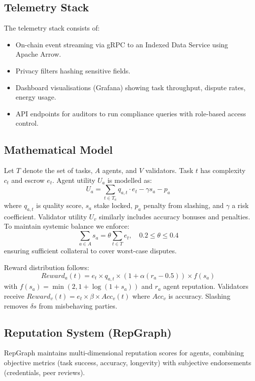 \documentclass[11pt]{article}
\begin{document}
\subsection{Telemetry Stack}
The telemetry stack consists of:
\begin{itemize}[noitemsep]
  \item On-chain event streaming via gRPC to an Indexed Data Service using Apache Arrow.
  \item Privacy filters hashing sensitive fields.
  \item Dashboard visualisations (Grafana) showing task throughput, dispute rates, energy usage.
  \item API endpoints for auditors to run compliance queries with role-based access control.
\end{itemize}

\subsection{Mathematical Model}
Let $T$ denote the set of tasks, $A$ agents, and $V$ validators. Task $t$ has complexity $c_t$ and escrow $e_t$. Agent utility $U_a$ is modelled as:
\begin{equation}
U_a = \sum_{t \in T_a} q_{a,t}\cdot e_t - \gamma s_a - p_a\label{eq:agent-utility}
\end{equation}
where $q_{a,t}$ is quality score, $s_a$ stake locked, $p_a$ penalty from slashing, and $\gamma$ a risk coefficient. Validator utility $U_v$ similarly includes accuracy bonuses and penalties. To maintain systemic balance we enforce:
\begin{equation}
\sum_{a \in A} s_a = \theta \sum_{t \in T} e_t,\quad 0.2 \leq \theta \leq 0.4
\end{equation}
ensuring sufficient collateral to cover worst-case disputes.

Reward distribution follows:
\begin{equation}
Reward_a(t) = e_t \times q_{a,t} \times \left(1 + \alpha (r_a - 0.5)\right) \times f(s_a)
\end{equation}
with $f(s_a) = \min(2, 1 + \log(1+s_a))$ and $r_a$ agent reputation. Validators receive $Reward_v(t) = e_t \times \beta \times Acc_v(t)$ where $Acc_v$ is accuracy. Slashing removes $\delta s$ from misbehaving parties.

\subsection{Reputation System (RepGraph)}
\label{sec:reputation}
RepGraph maintains multi-dimensional reputation scores for agents, combining objective metrics (task success, accuracy, longevity) with subjective endorsements (credentials, peer reviews).
\end{document}
